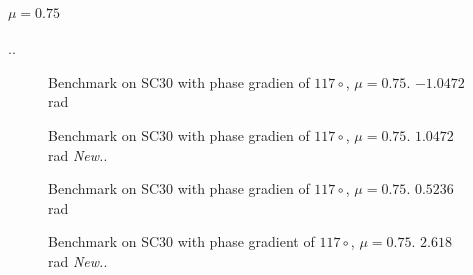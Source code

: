 \documentclass[../main.tex]{subfiles}
\begin{document}
\paragraph{$\mu = 0.75$}..
\begin{figure}[H]
    \centering
    
    \caption{Benchmark on SC30 with phase gradien of $117 \circ$, $\mu = 0.75$. $-1.0472$ rad}
    \label{fig:sc30_fixed_flat_phase}
\end{figure}
\begin{figure}[H]
    \centering
    
    \caption{Benchmark on SC30 with phase gradien of $117 \circ$, $\mu = 0.75$. $1.0472$ rad  \color{red} \textit{New.}\color{black}.}
    \label{fig:sc30_fixed_flat_phase}
\end{figure}
\begin{figure}[H]
    \centering
    
    \caption{Benchmark on SC30 with phase gradien of $117 \circ$, $\mu = 0.75$. $0.5236$ rad}
    \label{fig:sc30_fixed_flat_phase}
\end{figure}
\begin{figure}[H]
    \centering
    
    \caption{Benchmark on SC30 with phase gradient of $117 \circ$, $\mu = 0.75$. $2.618$ rad \color{red} \textit{New.}\color{black}.}
    \label{fig:sc30_fixed_flat_phase}
\end{figure}
\end{document}
